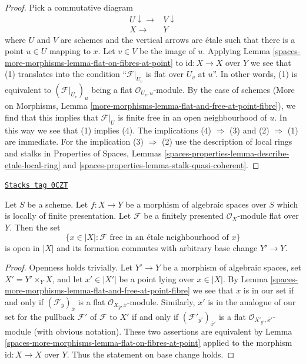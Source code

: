\begin{proof}
Pick a commutative diagram
$$
\begin{array}{cc}U \downarrow\longrightarrow & V \downarrow \\ X \longrightarrow & Y\end{array}
$$
where $U$ and $V$ are schemes and the vertical arrows are \'etale
such that there is a point $u \in U$ mapping to $x$. Let $v \in V$
be the image of $u$. Applying Lemma \ref{spaces-more-morphisms-lemma-flat-on-fibres-at-point}
to $\text{id} : X \to X$ over $Y$ we see that (1) translates into
the condition ``$\mathcal{F}|_{U_v}$ is flat over $U_v$ at $u$''.
In other words, (1) is equivalent to $(\mathcal{F}|_{U_v})_u$
being a flat $\mathcal{O}_{U_v, u}$-module.
By the case of schemes (More on Morphisms, Lemma
\ref{more-morphisms-lemma-flat-and-free-at-point-fibre}),
we find that this implies that
$\mathcal{F}|_U$ is finite free in an open neighbourhood
of $u$. In this way we see that (1) implies (4).
The implications (4) $\Rightarrow$ (3) and
(2) $\Rightarrow$ (1) are immediate.
For the implication (3) $\Rightarrow$ (2) use
the description of local rings and stalks in
Properties of Spaces, Lemmas
\ref{spaces-properties-lemma-describe-etale-local-ring} and
\ref{spaces-properties-lemma-stalk-quasi-coherent}.
\end{proof}

\begin{lemma}
\label{spaces-more-morphisms-lemma-finite-free-open}
\href{https://stacks.math.columbia.edu/tag/0CZT}{\texttt{Stacks tag 0CZT}}

Let $S$ be a scheme. Let $f : X \to Y$ be a morphism of algebraic spaces
over $S$ which is locally of finite presentation.
Let $\mathcal{F}$ be a finitely presented $\mathcal{O}_X$-module
flat over $Y$. Then the set
$$
\{x \in |X| : \mathcal{F}\text{ free in an \'etale neighbourhood of }x\}
$$
is open in $|X|$ and its formation commutes with arbitrary base change
$Y' \to Y$.
\end{lemma}

\begin{proof}
Openness holds trivially. Let $Y' \to Y$ be a morphism of algebraic spaces,
set $X' = Y' \times_Y X$,
and let $x' \in |X'|$ be a point lying over $x \in |X|$.
By Lemma \ref{spaces-more-morphisms-lemma-flat-and-free-at-point-fibre}
we see that $x$ is in our set if and only if
$(\mathcal{F}_{\overline{y}})_{\overline{x}}$ is a flat
$\mathcal{O}_{X_{\overline{y}}, \overline{x}}$-module.
Similarly, $x'$ is in the analogue of our set for the pullback
$\mathcal{F}'$ of $\mathcal{F}$ to $X'$ if and only if
$(\mathcal{F}'_{\overline{y}'})_{\overline{x}'}$ is a flat
$\mathcal{O}_{X'_{\overline{y}'}, \overline{x}'}$-module
(with obvious notation). These two assertions are equivalent
by Lemma \ref{spaces-more-morphisms-lemma-flat-on-fibres-at-point} applied to
the morphism $\text{id} : X \to X$ over $Y$.
Thus the statement on base change holds.
\end{proof}

